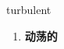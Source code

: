 
\begin{frame}
{\huge turbulent}
\begin{center}
\begin{enumerate}\Large
  \item \textbf{动荡的}
\end{enumerate}
\end{center}
\end{frame}
